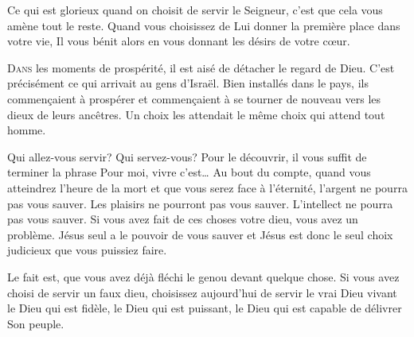 Ce qui est glorieux quand on choisit de servir le Seigneur,
 c'est que cela vous amène tout le reste.
 Quand vous choisissez de Lui donner la première place dans votre vie,
 Il vous bénit alors en vous donnant les désirs de votre c\oe{}ur. 

\dvrule







\lettrine{D}{ans} les moments de prospérité,
 il est aisé de détacher le regard de Dieu.
 C'est précisément ce qui arrivait au gens d'Israël.
 Bien installés dans le pays, ils commen\c{c}aient à prospérer
 \ocadr et commen\c{c}aient à se tourner de nouveau vers les dieux
 de leurs ancêtres.
 Un choix les attendait \ocadr le même choix qui attend tout homme.


Qui allez-vous servir? Qui servez-vous? Pour le découvrir,
 il vous suffit de terminer la phrase\frcolon{}
 \Og Pour moi, vivre c'est\dots{} \Fg{}
 Au bout du compte, quand vous atteindrez l'heure de la mort
 et que vous serez face à l'éternité, l'argent ne pourra pas vous sauver.
 Les plaisirs ne pourront pas vous sauver.
 L'intellect ne pourra pas vous sauver.
 Si vous avez fait de ces choses votre dieu, vous avez un problème.
 Jésus seul a le pouvoir de vous sauver
 et Jésus est donc le seul choix judicieux que vous puissiez faire.

Le fait est, que vous avez déjà fléchi le genou devant quelque chose.
 Si vous avez choisi de servir un faux dieu,
 choisissez aujourd'hui de servir le vrai Dieu vivant
 \ocadr le Dieu qui est fidèle, le Dieu qui est puissant,
 le Dieu qui est capable de délivrer Son peuple. 

